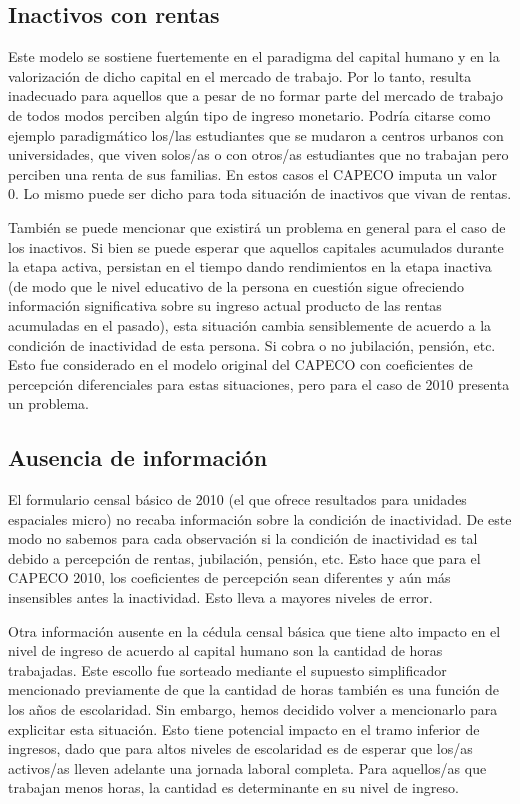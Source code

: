 	\subsection{Inactivos con rentas}

Este modelo se sostiene fuertemente en el paradigma del capital humano y en la valorización de dicho capital en el mercado de trabajo. Por lo tanto, resulta inadecuado para aquellos que a pesar de no formar parte del mercado de trabajo de todos modos perciben algún tipo de ingreso monetario. Podría citarse como ejemplo paradigmático los/las estudiantes que se mudaron a centros urbanos con universidades, que viven solos/as o con otros/as estudiantes que no trabajan pero perciben una renta de sus familias. En estos casos el CAPECO imputa un valor 0. Lo mismo puede ser dicho para toda situación de inactivos que vivan de rentas. 

También se puede mencionar que existirá un problema en general para el caso de los inactivos. Si bien se puede esperar que aquellos capitales acumulados durante la etapa activa, persistan en el tiempo dando rendimientos en la etapa inactiva (de modo que le nivel educativo de la persona en cuestión sigue ofreciendo información significativa sobre su ingreso actual producto de las rentas acumuladas en el pasado), esta situación cambia sensiblemente de acuerdo a la condición de inactividad de esta persona. Si cobra o no jubilación, pensión, etc. Esto fue considerado en el modelo original del CAPECO con coeficientes de percepción diferenciales para estas situaciones, pero para el caso de 2010 presenta un problema.

	
	\subsection{Ausencia de información}
	
El formulario censal básico de 2010 (el que ofrece resultados para unidades espaciales micro) no recaba información sobre la condición de inactividad. De este modo no sabemos para cada observación si la condición de inactividad es tal debido a percepción de rentas, jubilación, pensión, etc. Esto hace que para el CAPECO 2010, los coeficientes de percepción sean diferentes y aún más insensibles antes la inactividad. Esto lleva a mayores niveles de error.
		
Otra información ausente en la cédula censal básica que tiene alto impacto en el nivel de ingreso de acuerdo al capital humano son la cantidad de horas trabajadas. Este escollo fue sorteado mediante el supuesto simplificador mencionado previamente de que la cantidad de horas también es una función de los años de escolaridad. Sin embargo, hemos decidido volver a mencionarlo para explicitar esta situación. Esto tiene potencial impacto en el tramo inferior de ingresos, dado que para altos niveles de escolaridad es de esperar que los/as activos/as lleven adelante una jornada laboral completa. Para aquellos/as que trabajan menos horas, la cantidad es determinante en su nivel de ingreso.  

